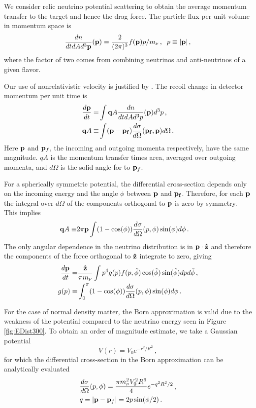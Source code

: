 We consider relic neutrino potential scattering to obtain the average momentum transfer to the target and hence the drag force. The particle flux per unit volume in momentum space is
\begin{equation}\label{dnQuantum}
\frac{dn}{dtd Ad^3{\bf p}}({\bf p})=\frac{2}{(2\pi)^3}f({\bf p})p/m_\nu\,,\hspace{2mm} p\equiv |{\bf p}|\,,
\end{equation}
where the factor of two comes from combining neutrinos and anti-neutrinos of a given flavor. 

Our use of nonrelativistic velocity is justified by  .  The recoil change in detector momentum per unit time is  
\begin{align}
\frac{d{\bf p}}{dt}=& \int  {\bf q}A \frac{dn}{dtdAd^3p}({\bf p})d^3p\,,\\
{\bf q}A\equiv &\int ({\bf p}-{\bf p_f})\frac{d\sigma}{ d\Omega}({\bf p_f},{\bf p})d\Omega\,.
\end{align}
Here ${\bf p}$ and ${\bf p}_f$, the incoming and outgoing momenta respectively, have the same magnitude. $qA$ is the momentum transfer times area, averaged over outgoing momenta, and $d\Omega$ is the solid angle for to ${\bf p}_f$.  

For a spherically symmetric potential, the differential cross-section depends only on the incoming energy and the angle $\phi$ between ${\bf p}$ and ${\bf p_f}$.  Therefore, for each ${\bf p}$ the integral over $d\Omega$ of the components orthogonal to ${\bf p}$ is zero by symmetry.  This implies
\begin{align}
{\bf q}A\equiv &2\pi{\bf p}\int(1-\cos(\phi))\frac{d\sigma}{ d\Omega}(p,\phi)\sin(\phi)d\phi\,.
\end{align}
The only angular dependence in the neutrino distribution is in ${\bf p}\cdot {\bf\hat z}$ and therefore the components of the force orthogonal to ${\bf \hat z}$ integrate to zero, giving
\begin{align}\label{drag}
\frac{d{\bf p}}{dt}=&\frac{{\bf\hat z}}{\pi m_\nu } \int p^4g(p) f(p,\tilde\phi) \cos(\tilde\phi) \sin(\tilde\phi) dpd\tilde\phi\,,\\
g(p)\equiv& \int_0^\pi(1-\cos(\phi))\frac{d\sigma}{ d\Omega}(p,\phi)\sin(\phi)d\phi\,.\label{geq}
\end{align}

For the case of normal density matter, the Born approximation is valid due to the weakness of the potential compared to the neutrino energy seen in Figure \ref{fig:EDist300}. To obtain an order of magnitude estimate, we take a Gaussian potential \begin{equation}
V(r)=V_0e^{-r^2/R^2}\,,
\end{equation}
for which the differential cross-section in the Born approximation can be analytically evaluated
\begin{align}
&\frac{d\sigma}{ d\Omega}(p,\phi)=\frac{\pi m_\nu^2V_0^2R^6}{4}e^{-q^2R^2/2}\,,\notag\\
&q=|{\bf p}-{\bf p}_f|=2p\sin(\phi/2)\,.
\end{align}

